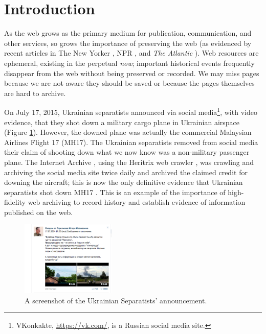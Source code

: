 \documentclass{sig-alternate}
\begin{document}



\section{Introduction}
\label{intro}

As the web grows as the primary medium for publication, communication, and other services, so grows the importance of preserving the web (as evidenced by recent articles in The New Yorker \cite{newyorker}, NPR \cite{npr}, and \emph{The Atlantic} \cite{lafrance}). Web resources are ephemeral, existing in the perpetual \emph{now}; important historical events frequently disappear from the web without being preserved or recorded. We may miss pages because we are not aware they should be saved or because the pages themselves are hard to archive. 

On July 17, 2015, Ukrainian separatists announced via social media\footnote{VKonkakte, \url{https://vk.com/}, is a Russian social media site.}, with video evidence, that they shot down a military cargo plane in Ukrainian airspace (Figure \ref{shotdown}). However, the downed plane was actually the commercial Malaysian Airlines Flight 17 (MH17). The Ukrainian separatists removed from social media their claim of shooting down what we now know was a non-military passenger plane. The Internet Archive \cite{iawebarchive}, using the Heritrix web crawler \cite{heritrix, Sigurosson:Incremental-Heritrix}, was crawling and archiving the social media site twice daily and archived the claimed credit for downing the aircraft; this is now the only definitive evidence that Ukrainian separatists shot down MH17 \cite{csm}. This is an example of the importance of high-fidelity web archiving to record history and establish evidence of information published on the web.

\begin{figure}[h!]
    \includegraphics[width=0.4\textwidth]{./imgs/shot_down.png}
  \caption{A screenshot of the Ukrainian Separatists' announcement.}
\label{shotdown}
\end{figure}%
\end{document}
